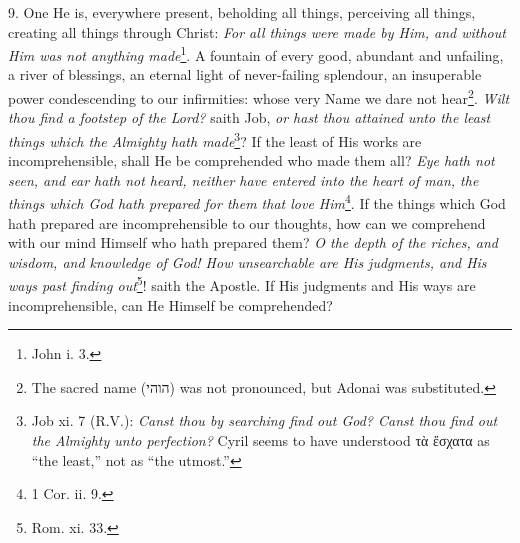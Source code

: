 9. One He is, everywhere present, beholding all things, perceiving all things, creating all things through Christ: \emph{For all things were made by Him, and without Him was not anything made}\footnote{John i. 3.}. A fountain of every good, abundant and unfailing, a river of blessings, an eternal light of never-failing splendour, an insuperable power condescending to our infirmities: whose very Name we dare not hear\footnote{The sacred name (\texthebrew{ה\texthebrew{והי}}) was not pronounced, but Adonai was substituted.}. \emph{Wilt thou find a footstep of the Lord?} saith Job, \emph{or hast thou attained unto the least things which the Almighty hath made}\footnote{Job xi. 7 (R.V.): \emph{Canst thou by searching find out God? Canst thou find out the Almighty unto perfection?} Cyril seems to have understood \textgreek{τὰ ἔσχατα} as “the least,” not as “the utmost.”}? If the least of His works are incomprehensible, shall He be comprehended who made them all? \emph{Eye hath not seen, and ear hath not heard, neither have entered into the heart of man, the things which God hath prepared for them that love Him}\footnote{1 Cor. ii. 9.}. If the things which God hath prepared are incomprehensible to our thoughts, how can we comprehend with our mind Himself who hath prepared them? \emph{O the depth of the riches, and wisdom, and knowledge of God! How unsearchable are His judgments, and His ways past finding out}\footnote{Rom. xi. 33.}! saith the Apostle. If His judgments and His ways are incomprehensible, can He Himself be comprehended?

